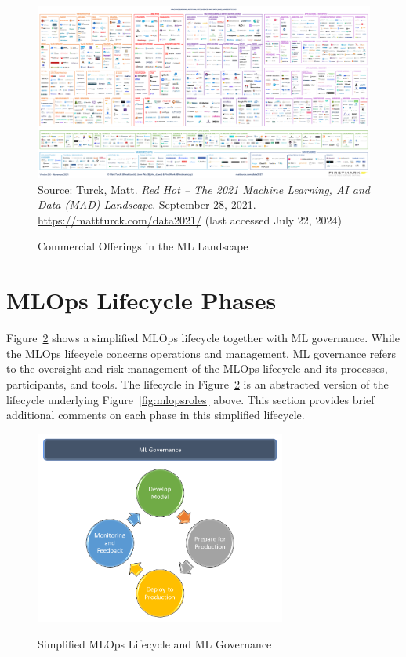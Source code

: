 \begin{figure}
\href{https://mattturck.com/wp-content/uploads/2021/12/2021-MAD-Landscape-v3.pdf}{
\includegraphics[width=\textwidth]{2021-MAD-Landscape-v3.pdf}} \\

\scriptsize Source: Turck, Matt. \textit{Red Hot -- The 2021 Machine Learning, AI and Data (MAD) Landscape}. September 28, 2021. \url{https://mattturck.com/data2021/} (last accessed July 22, 2024)
\caption{Commercial Offerings in the ML Landscape}
\label{fig:mlopstooling}
\end{figure}

\FloatBarrier
\section{MLOps Lifecycle Phases}
\label{sec:mlopslifecycle}

Figure~\ref{fig:mlopssimplifiedcycle} shows a simplified MLOps lifecycle together with ML governance. While the MLOps lifecycle concerns operations and management, ML governance refers to the oversight and risk management of the MLOps lifecycle and its processes, participants, and tools. The lifecycle in Figure~\ref{fig:mlopssimplifiedcycle} is an abstracted version of the lifecycle underlying Figure~\ref{fig:mlopsroles} above. This section provides brief additional comments on each phase in this simplified lifecycle. 

\begin{figure}
\centering
\includegraphics[height=2.5in]{graphics2.png} \\
\caption{Simplified MLOps Lifecycle and ML Governance}
\label{fig:mlopssimplifiedcycle}
\end{figure}

